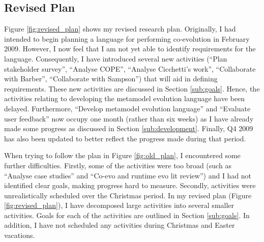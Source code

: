 \subsection{Revised Plan}
\label{sub:revised_plan}
Figure \ref{fig:revised_plan} shows my revised research plan. Originally, I had intended to begin planning a language for performing co-evolution in February 2009. However, I now feel that I am not yet able to identify requirements for the language. Consequently, I have introduced several new activities (``Plan stakeholder survey'', ``Analyse COPE'', ``Analyse Cicchetti's work'', ``Collaborate with Barber'', ``Collaborate with Sampson'') that will aid in defining requirements. These new activities are discussed in Section \ref{sub:goals}. Hence, the activities relating to developing the metamodel evolution language have been delayed. Furthermore, ``Develop metamodel evolution language'' and ``Evaluate user feedback'' now occupy one month (rather than six weeks) as I have already made some progress as discussed in Section \ref{sub:development}. Finally, Q4 2009 has also been updated to better reflect the progress made during that period.


When trying to follow the plan in Figure \ref{fig:old_plan}, I encountered some further difficulties. Firstly, some of the activities were too broad (such as ``Analyse case studies'' and ``Co-evo and runtime evo lit review'') and I had not identified clear goals, making progress hard to measure. Secondly, activities were unrealistically scheduled over the Christmas period.  In my revised plan (Figure \ref{fig:revised_plan}), I have decomposed large activities into several smaller activities. Goals for each of the activities are outlined in Section \ref{sub:goals}. In addition, I have not scheduled any activities during Christmas and Easter vacations.

